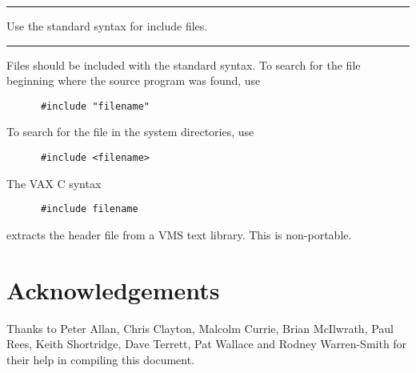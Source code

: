 \documentclass[twoside,11pt]{article}
\newcounter{sruleno}
\newcommand{\srule}[1]{
    \addtocounter{sruleno}{1}
    \goodbreak
    \rule[0.5ex]{\textwidth}{0.3mm}
    {\Large #1 \hfill {\thesruleno}}
    \rule[0.5ex]{\textwidth}{0.1mm}
}
\newcommand{\srule}[1]{
       \addtocounter{sruleno}{1}
       \begin{rawhtml} <HR> \end{rawhtml}
       {\Large \thesruleno}~~~~{\Large #1}
       \begin{rawhtml} <HR> \end{rawhtml}
       \end{tabular}
  }
\begin{document}
\srule{Use the standard syntax for include files.}
Files should be included with the standard syntax.  To search for the file
beginning where the source program was found, use
\begin{verbatim}
      #include "filename"
\end{verbatim}

To search for the file in the system directories, use
\begin{verbatim}
      #include <filename>
\end{verbatim}

The VAX C syntax
\begin{verbatim}
      #include filename
\end{verbatim}
extracts the header file from a VMS text library. This is non-portable.


\section{Acknowledgements}

Thanks to Peter Allan, Chris Clayton, Malcolm Currie, Brian McIlwrath, Paul
Rees, Keith Shortridge, Dave Terrett, Pat Wallace and
Rodney Warren-Smith for their help in compiling this document.
\end{document}
